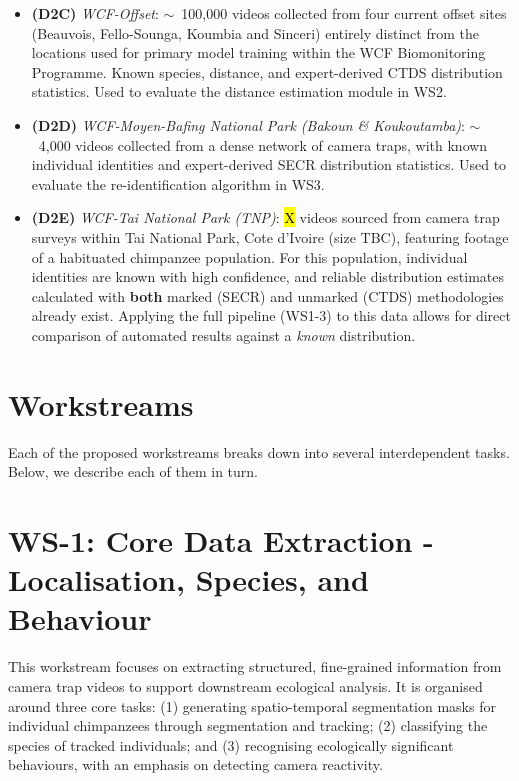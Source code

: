 \documentclass{article}
\begin{document}
\begin{itemize}
      \item \textbf{(D2C)} \textit{WCF-Offset}: $\sim$~100,000 videos collected from four current offset sites (Beauvois, Fello-Sounga, Koumbia and Sinceri) entirely distinct from the locations used for primary model training within the WCF Biomonitoring Programme. Known species, distance, and expert-derived CTDS distribution statistics. Used to evaluate the distance estimation module in WS2.
      \item \textbf{(D2D)} \textit{WCF-Moyen-Bafing National Park (Bakoun \& Koukoutamba)}: $\sim$~4,000 videos collected from a dense network of camera traps, with known individual identities and expert-derived SECR distribution statistics. Used to evaluate the re-identification algorithm in WS3.
      \item \textbf{(D2E)} \textit{WCF-Tai National Park (TNP)}: \hl{X} videos sourced from camera trap surveys within Tai National Park, Cote d'Ivoire (size TBC), featuring footage of a habituated chimpanzee population. For this population, individual identities are known with high confidence, and reliable distribution estimates calculated with \textbf{both} marked (SECR) and unmarked (CTDS) methodologies already exist. Applying the full pipeline (WS1-3) to this data allows for direct comparison of automated results against a \textit{known} distribution.
\end{itemize}

\section*{Workstreams}

Each of the proposed workstreams breaks down into several interdependent tasks. Below, we describe each of them in turn. %

\section*{WS-1: Core Data Extraction - Localisation, Species, and Behaviour}

This workstream focuses on extracting structured, fine-grained information from camera trap videos to support downstream ecological analysis. It is organised around three core tasks: (1) generating spatio-temporal segmentation masks for individual chimpanzees through segmentation and tracking; (2) classifying the species of tracked individuals; and (3) recognising ecologically significant behaviours, with an emphasis on detecting camera reactivity. %
\end{document}
